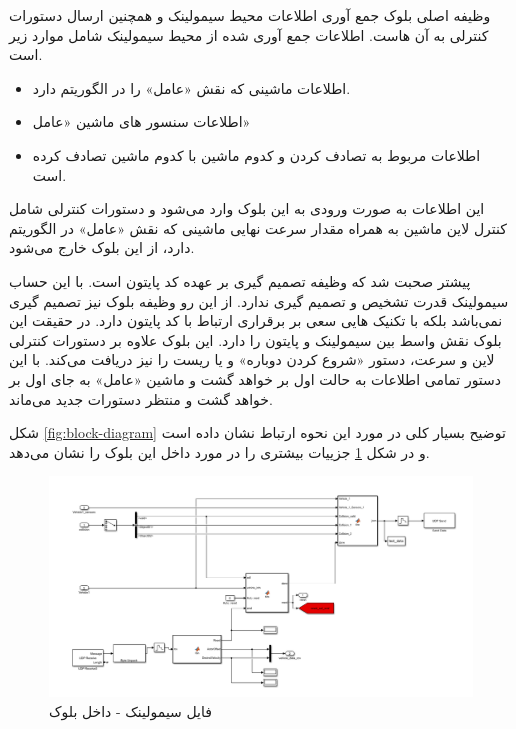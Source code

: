 وظیفه اصلی بلوک 
جمع آوری اطلاعات محیط سیمولینک و همچنین ارسال دستورات کنترلی به آن هاست. اطلاعات جمع آوری شده از محیط سیمولینک شامل موارد زیر است.

\begin{itemize}
	\item 
	اطلاعات ماشینی که نقش «عامل» را در الگوریتم دارد.
	\item 
	اطلاعات سنسور های ماشین «عامل»
	\item 
	اطلاعات مربوط به تصادف کردن و کدوم ماشین با کدوم ماشین تصادف کرده است.	
\end{itemize}

این اطلاعات به صورت ورودی به این بلوک وارد می‌شود و دستورات کنترلی شامل کنترل لاین ماشین به همراه مقدار سرعت نهایی ماشینی که نقش «عامل» در الگوریتم دارد، از این بلوک خارج می‌شود.

پیشتر صحبت شد که وظیفه تصمیم گیری بر عهده کد پایتون است. با این حساب سیمولینک قدرت تشخیص و تصمیم گیری ندارد. از این رو وظیفه بلوک 
نیز تصمیم گیری نمی‌باشد بلکه با تکنیک هایی سعی بر برقراری ارتباط با کد پایتون دارد. در حقیقت این بلوک نقش واسط بین سیمولینک و پایتون را دارد. این بلوک علاوه بر دستورات کنترلی لاین و سرعت، دستور «شروع کردن دوباره» و یا ریست را نیز دریافت می‌کند. با این دستور تمامی اطلاعات به حالت اول بر خواهد گشت و ماشین «عامل» به جای اول بر خواهد گشت و منتظر دستورات جدید می‌ماند.

شکل 
\ref{fig:block-diagram}
توضیح بسیار کلی  در مورد این نحوه ارتباط نشان داده است و در شکل 
\ref{fig:inside-environment}
جزییات بیشتری را در مورد داخل این بلوک را نشان می‌دهد.


\begin{figure}
	\centering
	\includegraphics[width=0.95\linewidth]{Figures/simulink/inside-Environment}
	\caption{فایل سیمولینک - داخل بلوک }
	\label{fig:inside-environment}
\end{figure}

